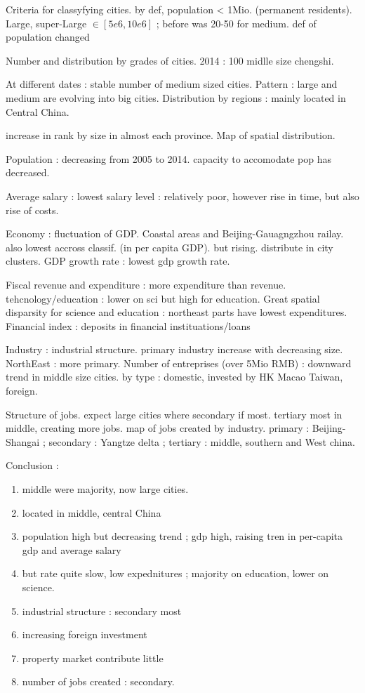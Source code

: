 Criteria for classyfying cities. by def, population < 1Mio. (permanent residents). Large, super-Large $\in [5e6,10e6]$ ; before was 20-50 for medium. def of population changed

Number and distribution by grades of cities. 2014 : 100 midlle size chengshi. 

At different dates : stable number of medium sized cities. Pattern : large and medium are evolving into big cities.
Distribution by regions : mainly located in Central China.

increase in rank by size in almost each province.
Map of spatial distribution.

Population : decreasing from 2005 to 2014. capacity to accomodate pop has decreased.

Average salary : lowest salary level : relatively poor, however rise in time, but also rise of costs.

Economy : fluctuation of GDP. Coastal areas and Beijing-Gauagngzhou railay. also lowest accross classif. (in per capita GDP). but rising. distribute in city clusters.
GDP growth rate : lowest gdp growth rate.

Fiscal revenue and expenditure : more expenditure than revenue.
tehcnology/education : lower on sci but high for education. Great spatial disparsity for science and education : northeast parts have lowest expenditures.
Financial index : deposits in financial instituations/loans

Industry : industrial structure. primary industry increase with decreasing size. NorthEast : more primary. 
Number of entreprises (over 5Mio RMB) : downward trend in middle size cities. by type : domestic, invested by HK Macao Taiwan, foreign.

Structure of jobs. expect large cities where secondary if most. tertiary most in middle, creating more jobs. map of jobs created by industry. primary : Beijing-Shangai ; secondary : Yangtze delta ; tertiary : middle, southern and West china.

Conclusion :
\begin{enumerate}
\item middle were majority, now large cities.
\item located in middle, central China
\item population high but decreasing trend ; gdp high, raising tren in per-capita gdp and average salary
\item but rate quite slow, low expednitures ; majority on education, lower on science.
\item industrial structure : secondary most
\item increasing foreign investment
\item property market contribute little
\item number of jobs created : secondary.
\end{enumerate}

